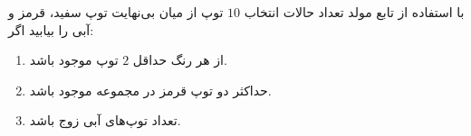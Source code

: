     \p 
با استفاده از تابع مولد تعداد حالات انتخاب
$10$
توپ از میان بی‌نهایت توپ سفید، قرمز و آبی را بیابید اگر:
\begin{enumerate}
\item
از هر رنگ حداقل
$2$
توپ موجود باشد.
\item
حداکثر دو توپ قرمز در مجموعه موجود باشد.
\item
تعداد توپ‌های آبی زوج باشد.
\end{enumerate}